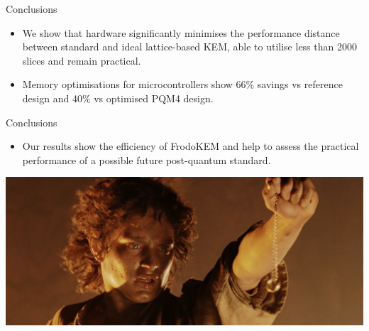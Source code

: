 \documentclass{beamer}            %
\begin{document}

\begin{frame}{Conclusions}

\begin{itemize}

\item We show that hardware significantly minimises the performance distance between standard and ideal lattice-based KEM, able to utilise less than 2000 slices and remain practical.

\item Memory optimisations for microcontrollers show 66\% savings vs reference design and 40\% vs optimised PQM4 design.


\end{itemize}

\end{frame}


\begin{frame}{Conclusions}


\begin{itemize}
\item Our results show the efficiency of \textsf{FrodoKEM} and help to assess the practical performance of a possible future post-quantum standard.

\end{itemize}

\begin{center}
\includegraphics[scale=0.15]{Frodo_Doom}
\end{center}

\end{frame}
\end{document}
